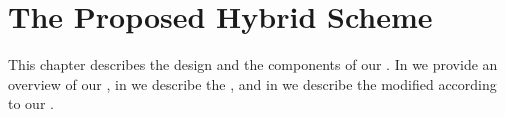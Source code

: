 \chapter{The Proposed Hybrid Scheme}
\label{sec:hybrid}

This chapter describes the design and the components of our \hybrid. In  we provide an overview of our \hybrid, in  we describe the \erbac, and in  we describe the \cac modified according to our \erbac. %








